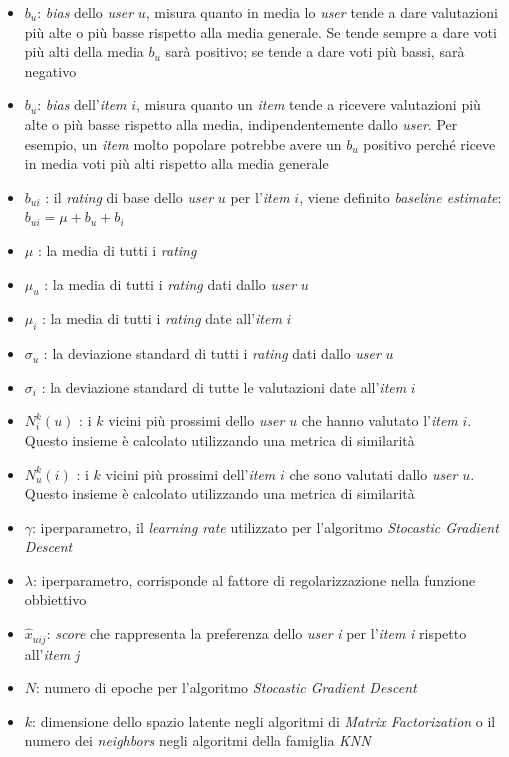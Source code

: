 \begin{itemize}
    \item $b_u$: \textit{bias} dello \textit{user} $u$, misura quanto in media lo \textit{user} tende a dare valutazioni più alte o più basse rispetto alla media generale. Se tende sempre a dare voti più alti della media $b_u$ sarà positivo; se tende a dare voti più bassi, sarà negativo
    \item $b_u$: \textit{bias} dell'\textit{item} $i$, misura quanto un \textit{item} tende a ricevere valutazioni più alte o più basse rispetto alla media, indipendentemente dallo \textit{user}. Per esempio, un \textit{item} molto popolare potrebbe avere un $b_u$ positivo perché riceve in media voti più alti rispetto alla media generale
    \item $b_{ui}$ : il \textit{rating} di base dello \textit{user} $u$ per l'\textit{item} $i$, viene definito \textit{baseline estimate}: $b_{ui} = \mu + b_u + b_i$
    \item $\mu$ : la media di tutti i \textit{rating}
    \item $\mu_u$ : la media di tutti i \textit{rating} dati dallo \textit{user} $u$
    \item $\mu_i$ : la media di tutti i \textit{rating} date all'\textit{item} $i$
    \item $\sigma_u$ : la deviazione standard di tutti i \textit{rating} dati dallo \textit{user} $u$
    \item $\sigma_i$ : la deviazione standard di tutte le valutazioni date all'\textit{item} $i$
    \item $N_i^k(u)$ : i $k$ vicini più prossimi dello \textit{user} $u$ che hanno valutato l'\textit{item} $i$. Questo insieme è calcolato utilizzando una metrica di similarità
    \item $N_u^k(i)$ : i $k$ vicini più prossimi dell'\textit{item} $i$ che sono valutati dallo \textit{user} $u$. Questo insieme è calcolato utilizzando una metrica di similarità
    \item $\gamma$: iperparametro, il \textit{learning rate} utilizzato per l'algoritmo \textit{Stocastic Gradient Descent}
    \item $\lambda$: iperparametro, corrisponde al fattore di regolarizzazione nella funzione obbiettivo
    \item $\hat{x}_{uij}$: \textit{score} che rappresenta la preferenza dello \textit{user} \textit{i} per l'\textit{item} \textit{i} rispetto all'\textit{item} \textit{j}
    \item $N$: numero di epoche per l'algoritmo \textit{Stocastic Gradient Descent}
    \item $k$: dimensione dello spazio latente negli algoritmi di \textit{Matrix Factorization} o il numero dei \textit{neighbors} negli algoritmi della famiglia \textit{KNN}
\end{itemize}

